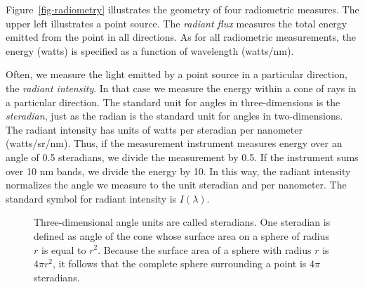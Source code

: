 \documentclass[
  letterpaper,
]{book}
\begin{document}
Figure~\ref{fig-radiometry} illustrates the geometry of four radiometric
measures. The upper left illustrates a point source. The \emph{radiant
flux} measures the total energy emitted from the point in all
directions. As for all radiometric measurements, the energy (watts) is
specified as a function of wavelength (watts/nm).

Often, we measure the light emitted by a point source in a particular
direction, the \emph{radiant intensity}. In that case we measure the
energy within a cone of rays in a particular direction. The standard
unit for angles in three-dimensions is the \emph{steradian}, just as the
radian is the standard unit for angles in two-dimensions. The radiant
intensity has units of watts per steradian per nanometer (watts/sr/nm).
Thus, if the measurement instrument measures energy over an angle of 0.5
steradians, we divide the measurement by 0.5. If the instrument sums
over 10 nm bands, we divide the energy by 10. In this way, the radiant
intensity normalizes the angle we measure to the unit steradian and per
nanometer. The standard symbol for radiant intensity is \(I(\lambda)\).

\begin{tcolorbox}[enhanced jigsaw, opacityback=0, breakable, coltitle=black, leftrule=.75mm, left=2mm, colframe=quarto-callout-note-color-frame, opacitybacktitle=0.6, bottomtitle=1mm, bottomrule=.15mm, toprule=.15mm, title=\textcolor{quarto-callout-note-color}{\faInfo}\hspace{0.5em}{Steradians}, titlerule=0mm, toptitle=1mm, colback=white, rightrule=.15mm, colbacktitle=quarto-callout-note-color!10!white, arc=.35mm]

\begin{figure}[H]


\caption{\label{fig-steradian}Three-dimensional angle units are called
steradians. One steradian is defined as angle of the cone whose surface
area on a sphere of radius \(r\) is equal to \(r^2\). Because the
surface area of a sphere with radius \(r\) is \(4 \pi r^2\), it follows
that the complete sphere surrounding a point is \(4 \pi\) steradians.}

\end{figure}%

\end{tcolorbox}
\end{document}
